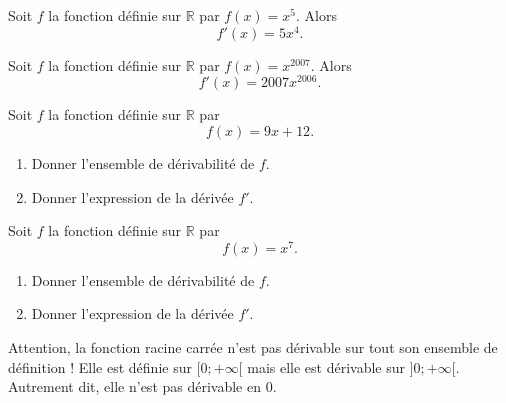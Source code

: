 \documentclass[11pt]{article}
\begin{document}
\noindent\begin{minipage}{.49\textwidth}
\begin{exemple}
  Soit $f$ la fonction définie sur $\mathbb{R}$ par $f(x)=x^5$. Alors
  \[
    f'(x) = 5x^4.
  \]
\end{exemple}
\end{minipage}
\hfill
\begin{minipage}{.49\textwidth}
\begin{exemple}
  Soit $f$ la fonction définie sur $\mathbb{R}$ par $f(x)=x^{2007}$. Alors
  \[
    f'(x) = 2007x^{2006}.
  \]
\end{exemple}
\end{minipage}

\noindent\begin{minipage}{.49\textwidth}
\begin{app}
  Soit $f$ la fonction définie sur $\mathbb{R}$ par $$f(x) = 9x+12.$$
  \begin{enumerate}
    \item Donner l'ensemble de dérivabilité de $f$.
    \item Donner l'expression de la dérivée $f'$.
  \end{enumerate}
\end{app}
\end{minipage}
\hfill
\begin{minipage}{.49\textwidth}
  \begin{app}
  Soit $f$ la fonction définie sur $\mathbb{R}$ par $$f(x) = x^7.$$
  \begin{enumerate}
    \item Donner l'ensemble de dérivabilité de $f$.
    \item Donner l'expression de la dérivée $f'$.
  \end{enumerate}
  \end{app}
\end{minipage}

\begin{rmq}
  Attention, la fonction racine carrée n'est pas dérivable sur tout son ensemble
  de définition ! Elle est définie sur $[0;+\infty[$ mais elle est dérivable sur
  $]0;+\infty[$. Autrement dit, elle n'est pas dérivable en $0$.
\end{rmq}
\end{document}
